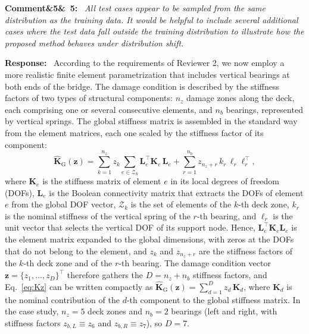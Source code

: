 \documentclass[11pt]{article}
\newenvironment{rcomment}[1]{\par\bigskip\noindent\textbf{Comment\ifx&#1&\else\ #1\fi:}\ \itshape}{\par}
\newenvironment{response}{\par\smallskip\noindent\color{resp}\textbf{Response:}\ }{\par}
\newcommand{\z}{\mathbf{z}}
\begin{document}
\begin{rcomment}{5}
All test cases appear to be sampled from the same distribution as the training data. It would be helpful to include several additional cases where the test data fall outside the training distribution to illustrate how the proposed method behaves under distribution shift.
\end{rcomment}

\begin{response}
According to the requirements of Reviewer 2, we now employ a more realistic finite element  parametrization that includes vertical bearings at both ends of the bridge. 
The damage condition is described by the stiffness factors of two types of structural components: $n_z$ damage zones
along the deck, each comprising one or several consecutive elements, and $n_b$ bearings, represented by vertical springs.
The global stiffness matrix is assembled in the standard way from the element matrices, each one scaled by the
stiffness factor of its component:
\begin{equation}
	\hat{\mathbf{K}}_{\mathrm{G}}(\z)=\sum_{k=1}^{n_z} z_k\sum_{e\in\mathcal{Z}_k}\mathbf{L}_e^{\top}\mathbf{K}_e\,\mathbf{L}_e
	+\sum_{r=1}^{n_b} z_{n_z+r}\,k_r\,\bm{\ell}_r\bm{\ell}_r^{\top},
	\label{eq:Kz}
\end{equation}
where $\mathbf{K}_e$ is the stiffness matrix of element $e$ in its local degrees of freedom (DOFs), $\mathbf{L}_e$ is the
Boolean connectivity matrix that extracts the DOFs of element $e$ from the global DOF vector, $\mathcal{Z}_k$ is the set of
elements of the $k$-th deck zone, $k_r$ is the nominal stiffness of the vertical spring of the $r$-th bearing, and
$\bm{\ell}_r$ is the unit vector that selects the vertical DOF of its support node. Hence, $\mathbf{L}_e^{\top}\mathbf{K}_e
\mathbf{L}_e$ is the element matrix expanded to the global dimensions, with zeros at the DOFs that do not belong to the
element, and $z_k$ and $z_{n_z+r}$ are the
stiffness factors of the $k$-th deck zone and of the $r$-th bearing. The damage condition vector
$\z=\{z_1,\dots,z_D\}^{\top}$ therefore gathers the $D=n_z+n_b$ stiffness factors, and Eq.~\eqref{eq:Kz} can be written
compactly as $\hat{\mathbf{K}}_{\mathrm{G}}(\z)=\sum_{d=1}^{D}z_d\,\mathbf{K}_d$, where $\mathbf{K}_d$ is the nominal
contribution of the $d$-th component to the global stiffness matrix. In the case study, $n_z=5$ deck zones and $n_b=2$
bearings (left and right, with stiffness factors $z_{b,L}\equiv z_6$ and $z_{b,R}\equiv z_7$), so $D=7$.


\end{response}
\end{document}
